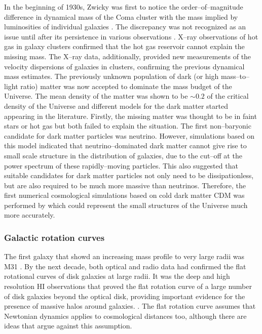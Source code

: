 \documentclass[paper=a4, fontsize=11pt]{scrartcl} %
\numberwithin{equation}{section} %
\numberwithin{figure}{section} %
\numberwithin{table}{section} %
\newcommand{\ignore}[1]{}
\begin{document}
In the beginning of 1930s, Zwicky was first to notice the order--of--magnitude difference in dynamical mass of the Coma cluster with the mass implied by luminosities of individual galaxies \citep[][]{Zwicky1993}. The discrepancy was not recognized as an issue until after its persistence in various observations \citep[e.g. \ignore{Vera Rubin in 1970s}][]{Einasto+1974, Ostriker+1974}. X--ray observations of hot gas in galaxy clusters confirmed that the hot gas reservoir cannot explain the missing mass. The X--ray data, additionally, provided new measurements of the velocity dispersions of galaxies in clusters, confirming the previous dynamical mass estimates\ignore{(Forman et al. 1972, Gursky et al. 1972, Kellogg et al. 1973)}. The previously unknown population of dark (or high mass--to--light ratio) matter was now accepted to dominate the mass budget of the Universe. The mean density of the matter was shown to be $\sim 0.2$ of the critical density of the Universe and different models for the dark matter started appearing in the literature. Firstly, the missing matter was thought to be in faint stars or hot gas but both failed to explain the situation\ignore{cite and explain why! or maybe not as it's not really important now!!}. The first non--baryonic candidate for dark matter particles was neutrino. However, simulations based on this model \citep[][]{Doroshkevich+1978} indicated that neutrino--dominated dark matter cannot give rise to small scale structure in the distribution of galaxies, due to the cut--off at the power spectrum of these rapidly--moving particles. This also suggested that suitable candidates for dark matter particles not only need to be dissipationless, but are also required to be much more massive than neutrinos\ignore{(Blumenthal et al. 1982, Bond et al. 1982, Peebles, 1982)}. Therefore, the first numerical cosmological simulations based on cold dark matter CDM was performed by \citep[][]{Melott+1983} which could represent the small structures of the Universe much more accurately.

\subsubsection{Galactic rotation curves}

The first galaxy that showd an increasing mass profile to very large radii was M31 \citep[][]{Rubin.Ford1970}. By the next decade, both optical\ignore{ (Rubin+1978, Rubin+1980)} and radio\ignore{ (Bosma 1978)} data had confirmed the flat rotational curves of disk galaxies at large radii. It was the deep and high resolution HI observations that proved the flat rotation curve of a large number of disk galaxies beyond the optical disk, providing important evidence for the presence of massive halos around galaxies. \citet[see e.g.][]{Bosma1981, Begeman1989}. The flat rotation curve assumes that Newtonian dynamics applies to cosmological distances too, although there are ideas that argue against this assumption.
\end{document}
